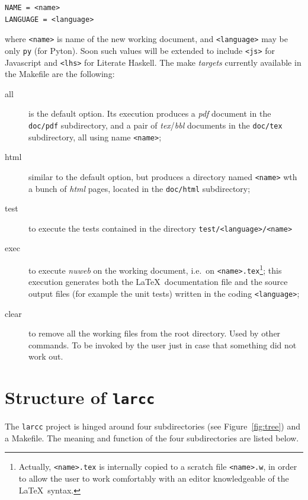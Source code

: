 \documentclass[11pt,oneside]{article}	%
\begin{document}
\begin{verbatim}
NAME = <name>
LANGUAGE = <language>
\end{verbatim}
where \texttt{<name>} is name of the new working document, and \texttt{<language>} may be only \texttt{py} (for Pyton). Soon such values will be extended to include \texttt{<js>} for Javascript and \texttt{<lhs>} for Literate Haskell.
The make \emph{targets} currently available in the Makefile are the following:
\begin{description}
\item[all] 
is the default option. Its execution produces a \emph{pdf} document in the \texttt{doc/pdf} subdirectory, and a pair of \emph{tex}/\emph{bbl} documents in the \texttt{doc/tex} subdirectory, all using name \texttt{<name>};
\item[html] 
similar to the default option, but produces a directory named \texttt{<name>} wth a bunch of \emph{html} pages, located in the \texttt{doc/html} subdirectory;

\item[test] 
to execute the tests contained in the directory \texttt{test/<language>/<name>}
\item[exec] 
to execute \emph{nuweb} on the working document, i.e.~on \texttt{<name>.tex}\footnote{Actually, \texttt{<name>.tex} is internally copied to a scratch file \texttt{<name>.w}, in order to allow the user to work comfortably with an editor knowledgeable of the \LaTeX\ syntax.}; this execution generates both the \LaTeX\ documentation file and the source output files (for example the unit tests) written in the coding \texttt{<language>};
\item[clear] 
to remove all the working files from the root directory. Used by other commands. To be invoked by the user just in case that something did not work out.
\end{description}



\section{Structure of \texttt{larcc}}

The \texttt{larcc} project is hinged around four subdirectories (see Figure~\ref{fig:tree}) and a Makefile.
The meaning and function of the four subdirectories are listed below.
\end{document}
